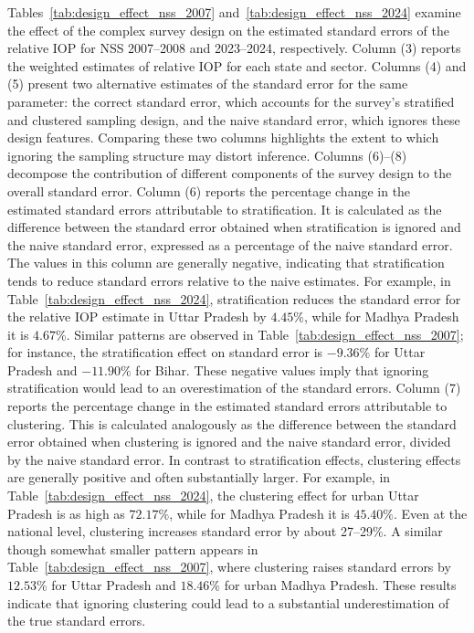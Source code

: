 \documentclass[12pt]{article}
\theoremstyle{plain}
\theoremstyle{definition}
\begin{document}
Tables~\ref{tab:design_effect_nss_2007} and~\ref{tab:design_effect_nss_2024} examine the effect of the complex survey design on the estimated standard errors of the relative IOP for NSS 2007--2008 and 2023--2024, respectively. Column (3) reports the weighted estimates of relative IOP for each state and sector. Columns (4) and (5) present two alternative estimates of the standard error for the same parameter: the correct standard error, which accounts for the survey's stratified and clustered sampling design, and the naive standard error, which ignores these design features. Comparing these two columns highlights the extent to which ignoring the sampling structure may distort inference.
Columns (6)--(8) decompose the contribution of different components of the survey design to the overall standard error. Column (6) reports the percentage change in the estimated standard errors attributable to stratification. It is calculated as the difference between the standard error obtained when stratification is ignored and the naive standard error, expressed as a percentage of the naive standard error. The values in this column are generally negative, indicating that stratification tends to reduce standard errors relative to the naive estimates. For example, in Table~\ref{tab:design_effect_nss_2024}, stratification reduces the standard error for the relative IOP estimate in Uttar Pradesh by $4.45\%$, while for Madhya Pradesh it is $4.67\%$. Similar patterns are observed in Table~\ref{tab:design_effect_nss_2007}; for instance, the stratification effect on standard error is $-9.36\%$ for Uttar Pradesh and $-11.90\%$ for Bihar. These negative values imply that ignoring stratification would lead to an overestimation of the standard errors. 
Column (7) reports the percentage change in the estimated standard errors attributable to clustering. This is calculated analogously as the difference between the standard error obtained when clustering is ignored and the naive standard error, divided by the naive standard error. In contrast to stratification effects, clustering effects are generally positive and often substantially larger. For example, in Table~\ref{tab:design_effect_nss_2024}, the clustering effect for urban Uttar Pradesh is as high as $72.17\%$, while for Madhya Pradesh it is $45.40\%$. Even at the national level, clustering increases standard error by about 27--29\%. A similar though somewhat smaller pattern appears in Table~\ref{tab:design_effect_nss_2007}, where clustering raises standard errors by $12.53\%$ for Uttar Pradesh and $18.46\%$ for urban Madhya Pradesh. These results indicate that ignoring clustering could lead to a substantial underestimation of the true standard errors.
\end{document}
